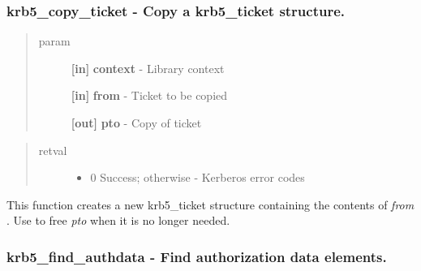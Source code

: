 \documentclass[letterpaper,10pt,english]{sphinxmanual}
\begin{document}
\subsubsection{krb5\_copy\_ticket -  Copy a krb5\_ticket structure.}
\label{appdev/refs/api/krb5_copy_ticket:krb5-copy-ticket-copy-a-krb5-ticket-structure}\label{appdev/refs/api/krb5_copy_ticket::doc}

\begin{fulllineitems}
\label{appdev/refs/api/krb5_copy_ticket:krb5_copy_ticket}
\end{fulllineitems}

\begin{quote}\begin{description}
\item[{param}] \leavevmode
\textbf{{[}in{]}} \textbf{context} - Library context

\textbf{{[}in{]}} \textbf{from} - Ticket to be copied

\textbf{{[}out{]}} \textbf{pto} - Copy of ticket

\end{description}\end{quote}
\begin{quote}\begin{description}
\item[{retval}] \leavevmode\begin{itemize}
\item {} 
0   Success; otherwise - Kerberos error codes

\end{itemize}

\end{description}\end{quote}

This function creates a new krb5\_ticket structure containing the contents of \emph{from} . Use {\hyperref[appdev/refs/api/krb5_free_ticket:krb5_free_ticket]{}} to free \emph{pto} when it is no longer needed.


\subsubsection{krb5\_find\_authdata -  Find authorization data elements.}
\label{appdev/refs/api/krb5_find_authdata:krb5-find-authdata-find-authorization-data-elements}\label{appdev/refs/api/krb5_find_authdata::doc}
\end{document}
